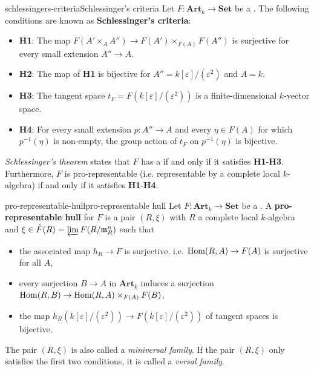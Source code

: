 \begin{topic}{schlessingers-criteria}{Schlessinger's criteria}
    Let $F \colon \textbf{Art}_k \to \textbf{Set}$ be a . The following conditions are known as \textbf{Schlessinger's criteria}:
    \begin{itemize}
        \item \textbf{H1}: The map $F(A' \times_A A'') \to F(A') \times_{F(A)} F(A'')$ is surjective for every small extension $A'' \to A$.
        \item \textbf{H2}: The map of \textbf{H1} is bijective for $A'' = k[\varepsilon] / (\varepsilon^2)$ and $A = k$.
        \item \textbf{H3}: The tangent space $t_F = F(k[\varepsilon]/(\varepsilon^2))$ is a finite-dimensional $k$-vector space.
        \item \textbf{H4}: For every small extension $p \colon A'' \to A$ and every $\eta \in F(A)$ for which $p^{-1}(\eta)$ is non-empty, the group action of $t_F$ on $p^{-1}(\eta)$ is bijective.
    \end{itemize}
    \textit{Schlessinger's theorem} states that $F$ has a  if and only if it satisfies \textbf{H1}-\textbf{H3}. Furthermore, $F$ is pro-representable (i.e. representable by a complete local $k$-algebra) if and only if it satisfies \textbf{H1}-\textbf{H4}.
\end{topic}

\begin{topic}{pro-representable-hull}{pro-representable hull}
    Let $F \colon \textbf{Art}_k \to \textbf{Set}$ be a .
    A \textbf{pro-representable hull} for $F$ is a pair $(R, \xi)$ with $R$ a complete local $k$-algebra and $\xi \in \hat{F}(R) = \varprojlim F(R / \mathfrak{m}_R^n)$ such that
    \begin{itemize}
        \item the associated map $h_R \to F$ is surjective, i.e. $\operatorname{Hom}(R, A) \to F(A)$ is surjective for all $A$,
        \item every surjection $B \to A$ in $\textbf{Art}_k$ induces a surjection $\operatorname{Hom}(R, B) \to \operatorname{Hom}(R, A) \times_{F(A)} F(B)$,
        \item the map $h_R(k[\varepsilon]/(\varepsilon^2)) \to F(k[\varepsilon]/(\varepsilon^2))$ of tangent spaces is bijective.
    \end{itemize}
    The pair $(R, \xi)$ is also called a \textit{miniversal family}. If the pair $(R, \xi)$ only satisfies the first two conditions, it is called a \textit{versal family}.
\end{topic}

